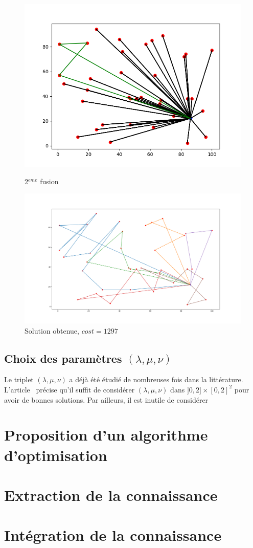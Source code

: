 \documentclass[a4paper,11pt]{article}%
\begin{document}
\begin{figure}
\begin{center}
	\includegraphics[scale=0.4]{CW2.png}
	\caption{2$^{eme}$ fusion}
	\label{CW2}


	 \includegraphics[scale=0.15]{resCW101010.png}
	 \caption{Solution obtenue, $cost = 1297$}
	\label{resCW101010}

\end{center}
\end{figure}


 
\subsection{Choix des paramètres $(\lambda, \mu, \nu)$}
Le triplet $(\lambda, \mu, \nu)$ a déjà été étudié de nombreuses fois dans la littérature. L'article~\cite{Altinel_2005} précise qu'il suffit de considérer $(\lambda, \mu, \nu)$ dans $]0,2] \times [0,2]^2$ pour avoir de bonnes solutions. 
Par ailleurs, il est inutile de considérer  

\section{Proposition d'un algorithme d'optimisation}

\section{Extraction de la connaissance}

\section{Intégration de la connaissance} 



\end{document}

